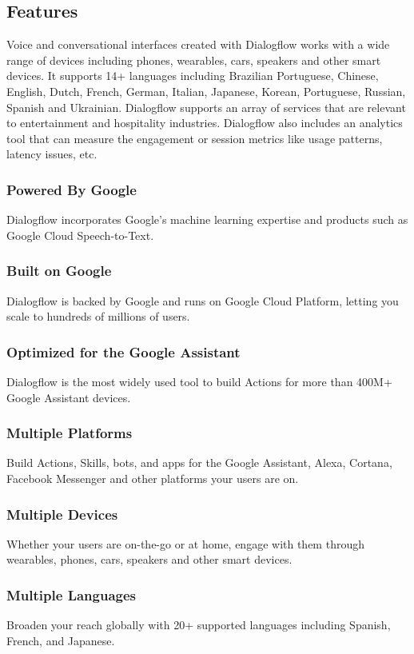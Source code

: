 \subsection{Features}

Voice and conversational interfaces created with Dialogflow works with a wide range of devices including phones, wearables, cars, speakers and other smart devices. 
It supports 14+ languages including Brazilian Portuguese, Chinese, English, Dutch, French, German, Italian, Japanese, Korean, Portuguese, Russian, Spanish and Ukrainian. 
Dialogflow supports an array of services that are relevant to entertainment and hospitality industries. 
Dialogflow also includes an analytics tool that can measure the engagement or session metrics like usage patterns, latency issues, etc.

\subsubsection {Powered By Google}
Dialogflow incorporates Google's machine learning expertise and products such as Google Cloud Speech-to-Text.
\subsubsection {Built on Google}
Dialogflow is backed by Google and runs on Google Cloud Platform, letting you scale to hundreds of millions of users.
\subsubsection {Optimized for the Google Assistant}
Dialogflow is the most widely used tool to build Actions for more than 400M+ Google Assistant devices.
\subsubsection {Multiple Platforms}
Build Actions, Skills, bots, and apps for the Google Assistant, Alexa, Cortana, Facebook Messenger and other platforms your users are on.
\subsubsection {Multiple Devices}
Whether your users are on-the-go or at home, engage with them through wearables, phones, cars, speakers and other smart devices.
\subsubsection {Multiple Languages}
Broaden your reach globally with 20+ supported languages including Spanish, French, and Japanese.



